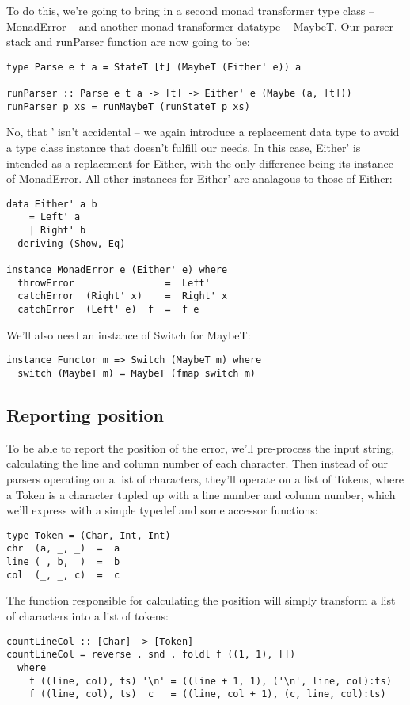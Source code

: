 \documentclass{tmr}
\begin{document}
To do this, we're going to bring in a second monad transformer type class -- MonadError -- and
another monad transformer datatype -- MaybeT.  Our parser stack and runParser function are now
going to be:
\begin{verbatim}
type Parse e t a = StateT [t] (MaybeT (Either' e)) a

runParser :: Parse e t a -> [t] -> Either' e (Maybe (a, [t]))
runParser p xs = runMaybeT (runStateT p xs)
\end{verbatim}
No, that ' isn't accidental -- we again introduce a replacement data type to avoid a type class
instance that doesn't fulfill our needs.  In this case, Either' is intended as a replacement for
Either, with the only difference being its instance of MonadError.  All other instances for 
Either' are analagous to those of Either:
\begin{verbatim}
data Either' a b
    = Left' a
    | Right' b
  deriving (Show, Eq)

instance MonadError e (Either' e) where
  throwError                =  Left'
  catchError  (Right' x) _  =  Right' x
  catchError  (Left' e)  f  =  f e
\end{verbatim}
We'll also need an instance of Switch for MaybeT:
\begin{verbatim}
instance Functor m => Switch (MaybeT m) where
  switch (MaybeT m) = MaybeT (fmap switch m)
\end{verbatim}

\subsection{Reporting position}
To be able to report the position of the error, we'll pre-process the input string, calculating
the line and column number of each character.  Then instead of our parsers operating on a list
of characters, they'll operate on a list of Tokens, where a Token is a character tupled up with
a line number and column number, which we'll express with a simple typedef and some accessor functions:
\begin{verbatim}
type Token = (Char, Int, Int)
chr  (a, _, _)  =  a
line (_, b, _)  =  b
col  (_, _, c)  =  c
\end{verbatim}
The function responsible for calculating the position will simply transform a list of characters into
a list of tokens:
\begin{verbatim}
countLineCol :: [Char] -> [Token]
countLineCol = reverse . snd . foldl f ((1, 1), [])
  where
    f ((line, col), ts) '\n' = ((line + 1, 1), ('\n', line, col):ts)
    f ((line, col), ts)  c   = ((line, col + 1), (c, line, col):ts)
\end{verbatim}
\end{document}

